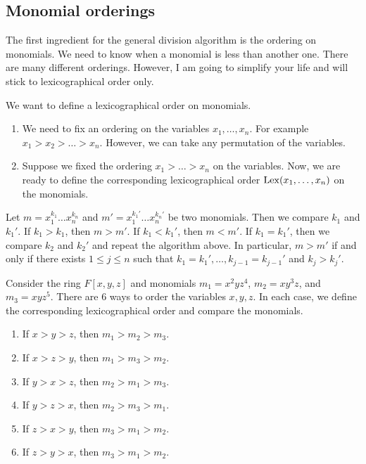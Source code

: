 \subsection{Monomial orderings}

The first ingredient for the general division algorithm is the ordering on monomials.
We need to know when a monomial is less than another one.
There are many different orderings.
However, I am going to simplify your life and will stick to lexicographical order only.

\begin{definition}
We want to define a lexicographical order on monomials.
\begin{enumerate}
\item We need to fix an ordering on the variables $x_1,\ldots,x_n$.
For example $x_1 > x_2 > \ldots > x_n$.
However, we can take any permutation of the variables.

\item Suppose we fixed the ordering $x_1 > \ldots > x_n$ on the variables.
Now, we are ready to define the corresponding lexicographical order $\operatorname{Lex}(x_1,\ldots,x_n)$ on the monomials.
\end{enumerate}
Let $m = x_1^{k_1}\ldots x_n^{k_n}$ and $m'= x_1^{k_1'}\ldots x_n^{k_n'}$ be two monomials.
Then we compare $k_1$ and $k_1'$.
If $k_1 > k_1$, then $m > m'$.
If $k_1 < k_1'$, then $m < m'$.
If $k_1 = k_1'$, then we compare $k_2$ and $k_2'$ and repeat the algorithm above.
In particular, $m > m'$ if and only if there exists $1\leqslant j \leqslant n$ such that $k_1 = k_1',\ldots, k_{j-1} = k_{j-1}'$ and $k_j > k_j'$.
\end{definition}

\begin{examples}
Consider the ring $F[x, y, z]$ and monomials $m_1 = x^2 y z^4$, $m_2 = x y^3 z$, and $m_3 = x y z^5$.
There are $6$ ways to order the variables $x, y, z$.
In each case, we define the corresponding lexicographical order and compare the monomials.
\begin{enumerate}
\item If $x > y > z$, then $m_1 > m_2 > m_3$.

\item If $x > z > y$, then $m_1 > m_3 > m_2$.

\item If $y > x > z$, then $m_2 > m_1 > m_3$.

\item If $y > z > x$, then $m_2 > m_3 > m_1$.

\item If $z > x > y$, then $m_3 > m_1 > m_2$.

\item If $z > y > x$, then $m_3 > m_1 > m_2$.
\end{enumerate}
\end{examples}


